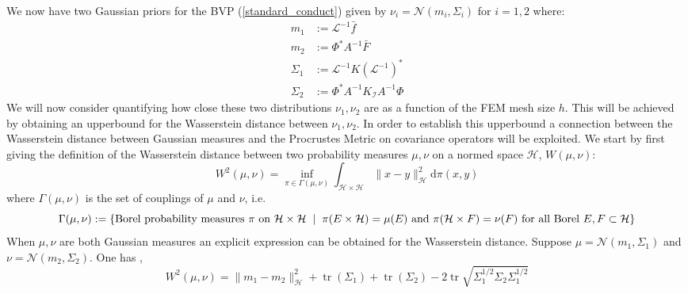 We now have two Gaussian priors for the BVP (\ref{standard_conduct}) given by $\nu_{i}=\mathcal{N}(m_{i},\Sigma_{i})$ for $i=1,2$ where:
\begin{align}
    \label{true_fem_mean}
    m_{1} &:= \mathcal{L}^{-1}\bar{f} \\
    \label{approx_fem_mean}
    m_{2} &:= \Phi^{*}A^{-1}\bar{F} \\
    \label{true_fem_cov}
    \Sigma_{1} &:= \mathcal{L}^{-1}K(\mathcal{L}^{-1})^{*} \\
    \label{approx_fem_cov}
    \Sigma_{2} &:= \Phi^{*}A^{-1}K_{\mathcal{I}}A^{-1}\Phi
\end{align}
We will now consider quantifying how close these two distributions $\nu_1,\nu_2$ are as a function of the FEM mesh size $h$. This will be achieved by obtaining an upperbound for the Wasserstein distance between $\nu_1,\nu_2$. In order to establish this upperbound a connection between the Wasserstein distance between Gaussian measures and the Procrustes Metric on covariance operators \textcolor{blue}{\cite{masarotto2019procrustes}} will be exploited. We start by first giving the definition of the Wasserstein distance between two probability measures $\mu,\nu$ on a normed space $\mathcal{H}$, $W(\mu,\nu)$:
\begin{equation}
    \label{wasserstein_def}
    W^{2}(\mu,\nu)=\inf_{\pi\in\Gamma(\mu,\nu)}\int_{\mathcal{H}\times\mathcal{H}}\|x-y\|^{2}_{\mathcal{H}}\mathrm{d}\pi(x,y)
\end{equation}
where $\Gamma(\mu,\nu)$ is the set of couplings of $\mu$ and $\nu$, i.e.
\begin{equation*}
    \Gamma(\mu,\nu):=\{\text{Borel probability measures } \pi \text{ on } \mathcal{H}\times\mathcal{H} \hspace{0.2cm} | \hspace{0.2cm} \pi(E\times\mathcal{H})=\mu(E) \text{ and } \pi(\mathcal{H}\times F)=\nu(F) \text{ for all Borel } E,F\subset\mathcal{H} \}
\end{equation*}
When $\mu,\nu$ are both Gaussian measures an explicit expression can be obtained for the Wasserstein distance. Suppose $\mu=\mathcal{N}(m_1,\Sigma_1)$ and $\nu=\mathcal{N}(m_2,\Sigma_2)$. One has \textcolor{blue}{\cite{masarotto2019procrustes}},
\begin{equation}
    W^{2}(\mu,\nu)=\|m_1-m_2\|^{2}_{\mathcal{H}}+\operatorname{tr}(\Sigma_1)+\operatorname{tr}(\Sigma_2)-2\operatorname{tr}\sqrt{\Sigma_{1}^{1/2}\Sigma_{2}\Sigma_{1}^{1/2}}
\end{equation}
